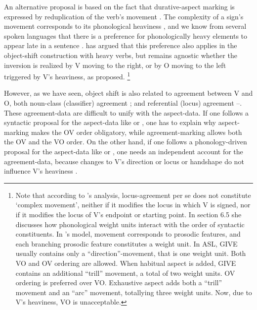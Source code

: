 \documentclass[output=paper,colorlinks,citecolor=brown,
]{langscibook}
\newcommand{\citeapos}[1]{\citeauthor{#1}'s \citeyearpar{#1}}
\begin{document}
An alternative proposal is based on the fact that durative-aspect
marking is expressed by reduplication of the verb’s movement 
\citep{Klima.Bellugi.1979}. The complexity of a sign’s movement corresponds to
its phonological heaviness \citep{Brentari.1998}, and we know from several
spoken languages that there is a preference for phonologically heavy
elements to appear late in a sentence .
\citet{Brentari.1998} has argued that this preference also applies in the
object-shift construction with heavy verbs, but remains agnostic
whether the inversion is realized by V moving to the right, or by O
moving to the left triggered by V’s heaviness, as \citet{Liddell.1980}
proposed.%
\footnote{
    Note that according to \citeapos{Brentari.1998} analysis, locus-agreement per se
    does not constitute `complex movement', neither if it modifies the locus in which V
    is signed, nor if it modifies the locus of V’s endpoint or starting point. In section 6.5
    she discusses how phonological weight units interact with the order of syntactic
    constituents. In \citeauthor{Brentari.1998}’s model, movement corresponds to prosodic features, and
    each branching prosodic feature constitutes a weight unit. In ASL, GIVE usually
    contains only a “direction”-movement, that is one weight unit. Both VO and OV
    ordering are allowed. When habitual aspect is added, GIVE contains an additional
    “trill” movement, a total of two weight units. OV ordering is preferred over VO.
    Exhaustive aspect adds both a “trill” movement and an “arc” movement, totallying
    three weight units. Now, due to V’s heaviness, VO is unacceptable.
}

However, as we have seen, object shift is also related to
agreement between V and O, both noun-class (classifier) agreement
; and referential (locus) agreement --. 
These agreement-data
are difficult to unify with the aspect-data. If one follows a syntactic
proposal for the aspect-data like \citet{Matsuoka.1997} or \citet{Braze.2004},
one has to explain why aspect-marking makes the OV order
obligatory, while agreement-marking allows both the OV and the VO
order. On the other hand, if one follows a phonology-driven proposal
for the aspect-data like \citet{Liddell.1980} or \citet{Brentari.1998}, one needs an
independent account for the agreement-data, because changes to V’s
direction or locus or handshape do not influence V’s heaviness
\citep{Brentari.1998}.
\end{document}
